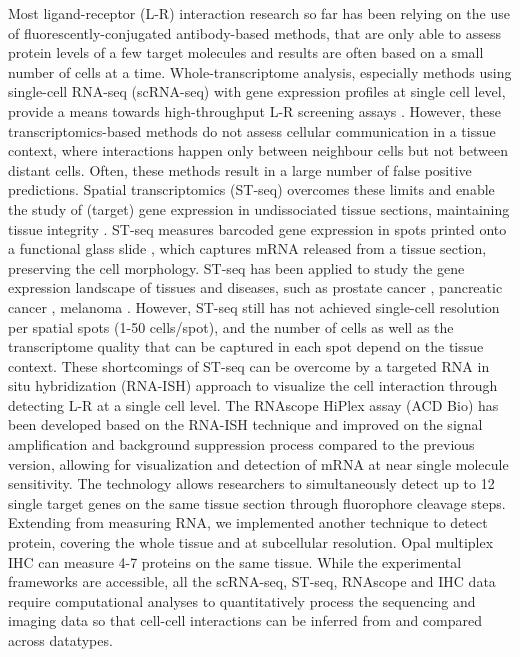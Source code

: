 Most ligand-receptor (L-R) interaction research so far has been relying on the use of fluorescently-conjugated antibody-based methods, that are only able to assess protein levels of a few target molecules and results are often based on a small number of cells at a time. Whole-transcriptome analysis, especially methods using single-cell RNA-seq (scRNA-seq) with gene expression profiles at single cell level, provide a means towards high-throughput L-R screening assays \cite{browaeys2020nichenet, efremova2020cellphonedb}. However, these transcriptomics-based methods do not assess cellular communication in a tissue context, where interactions happen only between neighbour cells but not between distant cells. Often, these methods result in a large number of false positive predictions. Spatial transcriptomics (ST-seq) overcomes these limits and enable the study of (target) gene expression in undissociated tissue sections, maintaining tissue integrity \cite{salmen2018barcoded}. ST-seq measures barcoded gene expression in spots printed onto a functional glass slide \cite{salmen2018barcoded}, which captures mRNA released from a tissue section, preserving the cell morphology.  ST-seq has been applied to study the gene expression landscape of tissues and diseases, such as prostate cancer \cite{berglund2018spatial, ji2020multimodal}, pancreatic cancer \cite{moncada2019integrating}, melanoma \cite{thrane2018spatially}. However, ST-seq still has not achieved single-cell resolution per spatial spots (1-50 cells/spot), and the number of cells as well as the transcriptome quality that can be captured in each spot depend on the tissue context. These shortcomings of ST-seq can be overcome by a targeted RNA in situ hybridization (RNA-ISH) approach to visualize the cell interaction through detecting L-R at a single cell level. The RNAscope HiPlex assay (ACD Bio) has been developed based on the RNA-ISH technique and improved on the signal amplification and background suppression process compared to the previous version, allowing for visualization and detection of mRNA at near single molecule sensitivity. The technology allows researchers to simultaneously detect up to 12 single target genes on the same tissue section through fluorophore cleavage steps. Extending from measuring RNA, we implemented another technique to detect protein, covering the whole tissue and at subcellular resolution. Opal multiplex IHC can measure 4-7 proteins on the same tissue. While the experimental frameworks are accessible, all the scRNA-seq, ST-seq, RNAscope and IHC data require computational analyses to quantitatively process the sequencing and imaging data so that cell-cell interactions can be inferred from and compared across datatypes. 

